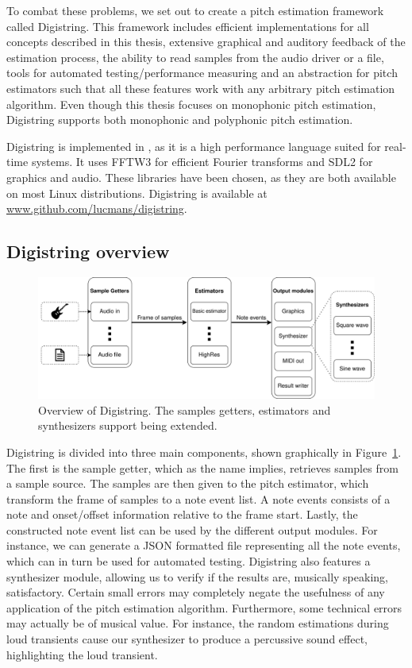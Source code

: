\documentclass[a4paper,10pt,twocolumn]{article}
\begin{document}
To combat these problems, we set out to create a pitch estimation framework called Digistring. This framework includes efficient implementations for all concepts described in this thesis, extensive graphical and auditory feedback of the estimation process, the ability to read samples from the audio driver or a file, tools for automated testing/performance measuring and an abstraction for pitch estimators such that all these features work with any arbitrary pitch estimation algorithm. Even though this thesis focuses on monophonic pitch estimation, Digistring supports both monophonic and polyphonic pitch estimation.

Digistring is implemented in \cpluspluslogo, as it is a high performance language suited for real-time systems. It uses FFTW3 for efficient Fourier transforms and SDL2 for graphics and audio. These libraries have been chosen, as they are both available on most Linux distributions. Digistring is available at \url{www.github.com/lucmans/digistring}.


\subsection{Digistring overview}
\begin{figure}[t]
    \centering
    \includegraphics[width=0.85\linewidth]{fig/digistring_overview2.png}
    \caption{Overview of Digistring. The samples getters, estimators and synthesizers support being extended.}
    \label{fig:digistring_overview}
\end{figure}
Digistring is divided into three main components, shown graphically in Figure~\ref{fig:digistring_overview}. The first is the sample getter, which as the name implies, retrieves samples from a sample source. The samples are then given to the pitch estimator, which transform the frame of samples to a note event list. A note events consists of a note and onset/offset information relative to the frame start. Lastly, the constructed note event list can be used by the different output modules. For instance, we can generate a JSON formatted file representing all the note events, which can in turn be used for automated testing. Digistring also features a synthesizer module, allowing us to verify if the results are, musically speaking, satisfactory. Certain small errors may completely negate the usefulness of any application of the pitch estimation algorithm. Furthermore, some technical errors may actually be of musical value. For instance, the random estimations during loud transients cause our synthesizer to produce a percussive sound effect, highlighting the loud transient.%
\end{document}
